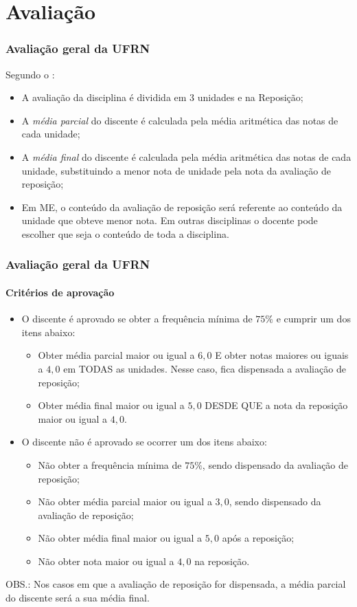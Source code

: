 \section{Avaliação}

\begin{frame}
	\frametitle{Avaliação geral da UFRN}

	Segundo o :
	
	\begin{itemize}
		\item A avaliação da disciplina é dividida em 3 unidades e na Reposição;
		\item A \emph{média parcial} do discente é calculada pela média aritmética das notas de cada unidade;
		\item A \emph{média final} do discente é calculada pela média aritmética das notas de cada unidade, substituindo a menor nota de unidade pela nota da avaliação de reposição;
		\item Em ME, o conteúdo da avaliação de reposição será referente ao conteúdo da unidade que obteve menor nota. Em outras disciplinas o docente pode escolher que seja o conteúdo de toda a disciplina.
	\end{itemize}

	
\end{frame}

\begin{frame}
	\frametitle{Avaliação geral da UFRN}
	\framesubtitle{Critérios de aprovação}

	\begin{itemize}
		\item O discente é aprovado se obter a frequência mínima de $75\%$ e cumprir um dos itens abaixo: 
		\begin{itemize}
			\item Obter média parcial maior ou igual a $6{,}0$ E obter notas maiores ou iguais a $4{,}0$ em TODAS as unidades. Nesse caso, fica dispensada a avaliação de reposição;
			\item Obter média final maior ou igual a $5{,}0$ DESDE QUE a nota da reposição maior ou igual a $4{,}0$.\pause
		\end{itemize}
		\item O discente não é aprovado se ocorrer um dos itens abaixo: 
		\begin{itemize}
			\item Não obter a frequência mínima de $75\%$, sendo dispensado da avaliação de reposição;
			\item Não obter média parcial maior ou igual a $3{,}0$, sendo dispensado da avaliação de reposição;
			\item Não obter média final maior ou igual a $5{,}0$ após a reposição;
			\item Não obter nota maior ou igual a $4{,}0$ na reposição.
		\end{itemize}
	\end{itemize}
OBS.: Nos casos em que a avaliação de reposição for dispensada, a média parcial do discente será a sua média final.
	
\end{frame}

